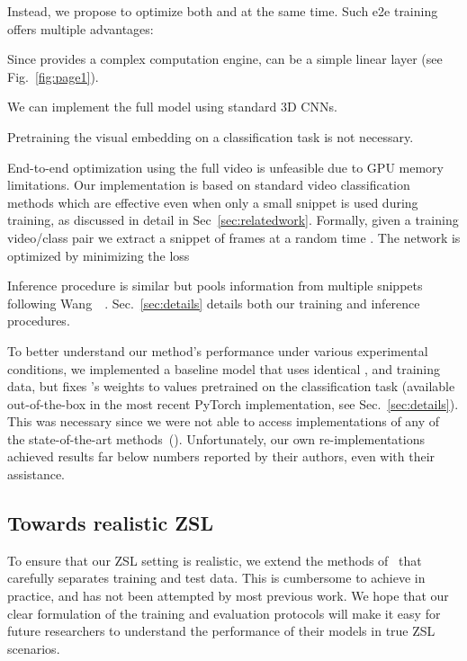 \documentclass[10pt,twocolumn,letterpaper]{article}
\begin{document}
Instead, we propose to optimize both  and  at the same time. Such e2e training offers multiple advantages:
\begin{compactenum}
\item Since  provides a complex computation engine,  can be a simple linear layer (see Fig.~\ref{fig:page1}).
\item We can implement the full model using standard 3D CNNs. 
\item Pretraining the visual embedding on a classification task is not necessary. 
\end{compactenum}

End-to-end optimization using the full video is unfeasible due to GPU memory limitations. Our implementation is based on standard video classification methods which are effective even when only a small snippet is used during training, as discussed in detail in Sec~\ref{sec:relatedwork}. Formally, given a training video/class pair  we extract a snippet  of  frames at a random time . The network is optimized by minimizing the loss

Inference procedure is similar but pools information from multiple snippets following Wang~\etal~\cite{tsn}. Sec.~\ref{sec:details} details both our training and inference procedures.

To better understand our method's performance under various experimental conditions, we implemented a baseline model that uses identical ,  and training data, but fixes 's weights to values pretrained on the classification task (available out-of-the-box in the most recent PyTorch implementation, see Sec.~\ref{sec:details}). This was necessary since we were not able to access implementations of any of the state-of-the-art methods~(\cite{tarn,action2vec,uar}). Unfortunately, our own re-implementations achieved results far below numbers reported by their authors, even with their assistance.

\subsection{Towards realistic ZSL}\label{sec:realistic}
To ensure that our ZSL setting is realistic, we extend the methods of~\cite{roitberg2018towards} that carefully separates training and test data. This is cumbersome to achieve in practice, and has not been attempted by most previous work. We hope that our clear formulation of the training and evaluation protocols will make it easy for future researchers to understand the performance of their models in true ZSL scenarios.
\end{document}
